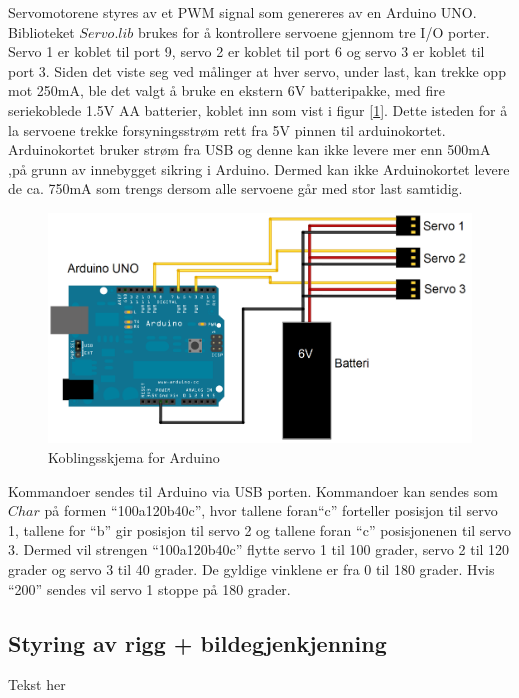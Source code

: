 Servomotorene styres av et PWM signal som genereres av en Arduino UNO. Biblioteket $Servo.lib$ brukes for å kontrollere servoene gjennom tre I/O porter. Servo 1 er koblet til port 9, servo 2 er koblet til port 6 og servo 3 er koblet til port 3. Siden det viste seg ved målinger at hver servo, under last, kan trekke opp mot 250mA, ble det valgt å bruke en ekstern 6V batteripakke, med fire seriekoblede 1.5V AA batterier, koblet inn som vist i figur [\ref{fig:ArduSkjem}]. Dette isteden for å la servoene trekke forsyningsstrøm rett fra 5V pinnen til arduinokortet. Arduinokortet bruker strøm fra USB og denne kan ikke levere mer enn 500mA ,på grunn av innebygget sikring i Arduino. Dermed kan ikke Arduinokortet levere de ca. 750mA som trengs dersom alle servoene går med stor last samtidig. 

\begin{figure}[h!]
	\centering
	\includegraphics[scale=0.25]{img/KoblingsskjemaArduino.png}
	\caption{Koblingsskjema for Arduino}
	\label{fig:ArduSkjem}
\end{figure}  

Kommandoer sendes til Arduino via USB porten. Kommandoer kan sendes som $Char$ på formen ``100a120b40c'', hvor tallene foran``c'' forteller posisjon til servo 1, tallene for ``b'' gir posisjon til servo 2 og tallene foran ``c'' posisjonenen til servo 3. Dermed vil strengen ``100a120b40c'' flytte servo 1 til 100 grader, servo 2 til 120 grader og servo 3 til 40 grader. De gyldige vinklene er fra 0 til 180 grader. Hvis ``200'' sendes vil servo 1 stoppe på 180 grader. 


\subsection{Styring av rigg + bildegjenkjenning}

Tekst her